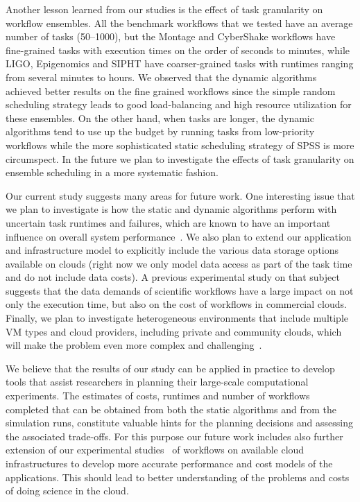 \documentclass{sig-alternate}
\begin{document}
Another lesson learned from our studies is the effect of task granularity on 
workflow ensembles. All the benchmark workflows that we tested have an average 
number of tasks (50--1000), but the Montage and CyberShake workflows have 
fine-grained tasks with execution times on the order of seconds to minutes, 
while LIGO, Epigenomics and SIPHT have coarser-grained tasks with runtimes 
ranging from several minutes to hours. We observed that the dynamic 
algorithms achieved better results on the fine grained workflows since the 
simple random scheduling strategy leads to good load-balancing and high 
resource utilization for these ensembles. On the other hand, when tasks are
longer, the dynamic algorithms tend to use up the budget by running tasks 
from low-priority workflows while the more sophisticated static scheduling 
strategy of SPSS is more circumspect. In the future we plan to investigate 
the effects of task granularity on ensemble scheduling in a more systematic
fashion.

Our current study suggests many areas for future work. One interesting
issue that we plan to investigate is how the static and dynamic algorithms 
perform with uncertain task runtimes and failures, which are known to have 
an important influence on overall system performance~\cite{Sakellariou2010,Dongarra2007}. 
We also plan to extend our application and infrastructure model to explicitly 
include the various data storage options available on clouds (right now we only 
model data access as part of the task time and do not include data costs). A previous 
experimental study on that subject~\cite{Juve2010} suggests that the data 
demands of scientific workflows have a large impact on not only the 
execution time, but also on the cost of workflows in commercial clouds. 
Finally, we plan to investigate heterogeneous environments that include 
multiple VM types and cloud providers, including private and community clouds, 
which will make the problem even more complex and challenging~\cite{Marshall2010,vockler11,Juve2010}.

We believe that the results of our study can be applied in practice to develop 
tools that assist researchers in planning their large-scale computational
experiments. The estimates of costs, runtimes and number of workflows completed
that can be obtained from both the static algorithms and from the simulation
runs, constitute valuable hints for the planning decisions and assessing the
associated trade-offs. For this purpose our future work includes also further
extension of our experimental studies~\cite{Juve2009,vockler11} of workflows on
available cloud infrastructures to develop more accurate performance and cost
models of the applications. This should lead to better understanding of the
problems and costs of doing science in the cloud.








\end{document}
